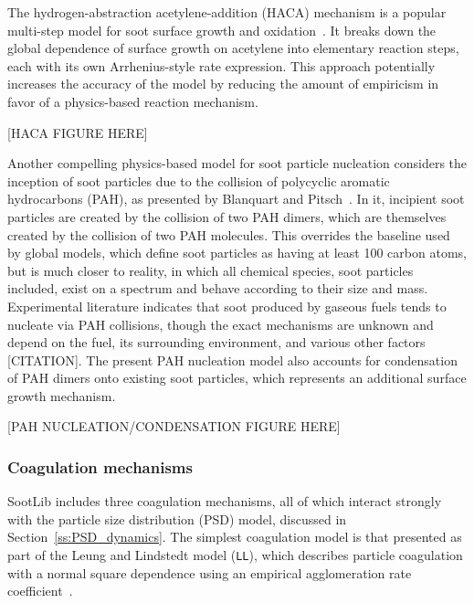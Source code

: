 \documentclass[preprint,12pt,letterpaper]{elsarticle}
\begin{document}
The hydrogen-abstraction acetylene-addition (HACA) mechanism is a popular multi-step model for soot surface growth and oxidation~\cite{Appel_2000}. It breaks down the global dependence of surface growth on acetylene into elementary reaction steps, each with its own Arrhenius-style rate expression. This approach potentially increases the accuracy of the model by reducing the amount of empiricism in favor of a physics-based reaction mechanism.

[HACA FIGURE HERE]

Another compelling physics-based model for soot particle nucleation considers the inception of soot particles due to the collision of polycyclic aromatic hydrocarbons (PAH), as presented by Blanquart and Pitsch~\cite{Blanquart_2009c}. In it, incipient soot particles are created by the collision of two PAH dimers, which are themselves created by the collision of two PAH molecules. This overrides the baseline used by global models, which define soot particles as having at least 100 carbon atoms, but is much closer to reality, in which all chemical species, soot particles included, exist on a spectrum and behave according to their size and mass. Experimental literature indicates that soot produced by gaseous fuels tends to nucleate via PAH collisions, though the exact mechanisms are unknown and depend on the fuel, its surrounding environment, and various other factors [CITATION]. The present PAH nucleation model also accounts for condensation of PAH dimers onto existing soot particles, which represents an additional surface growth mechanism.

[PAH NUCLEATION/CONDENSATION FIGURE HERE]

\subsubsection{Coagulation mechanisms}
\label{sss:coagulation}

SootLib includes three coagulation mechanisms, all of which interact strongly with the particle size distribution (PSD) model, discussed in Section~\ref{ss:PSD_dynamics}. The simplest coagulation model is that presented as part of the Leung and Lindstedt model (\texttt{LL}), which describes particle coagulation with a normal square dependence using an empirical agglomeration rate coefficient~\cite{Leung_1991}.
\end{document}
